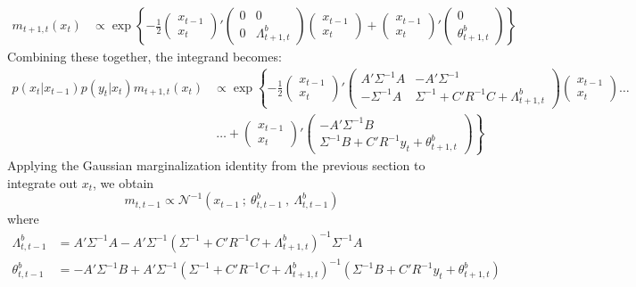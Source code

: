 \documentclass[12pt]{article}
\begin{document}
\begin{align*}
m_{t+1,t}(x_t)&\propto\exp\left\{-\frac{1}{2}\begin{pmatrix}x_{t-1}\\x_t\end{pmatrix}'\begin{pmatrix}0 & 0\\0 & \Lambda^b_{t+1,t}\end{pmatrix}\begin{pmatrix}x_{t-1}\\x_t\end{pmatrix} + \begin{pmatrix}x_{t-1}\\x_t\end{pmatrix}'\begin{pmatrix}0\\ \theta^b_{t+1,t}\end{pmatrix}\right\}
\end{align*}
Combining these together, the integrand becomes:
\begin{align*}
p(x_t|x_{t-1})p(y_t|x_t)m_{t+1,t}(x_t)&\propto\exp\left\{-\frac{1}{2}\begin{pmatrix}x_{t-1}\\x_t\end{pmatrix}'\begin{pmatrix}A'\Sigma^{-1}A & -A'\Sigma^{-1}\\-\Sigma^{-1}A & \Sigma^{-1}+C'R^{-1}C+\Lambda^b_{t+1,t}\end{pmatrix}\begin{pmatrix}x_{t-1}\\x_t\end{pmatrix}\right.\ldots\\
&\left. ~\ldots + \begin{pmatrix}x_{t-1}\\x_t\end{pmatrix}'\begin{pmatrix}-A'\Sigma^{-1}B\\ \Sigma^{-1}B+C'R^{-1}y_t+\theta^b_{t+1,t}\end{pmatrix}\right\}
\end{align*}
Applying the Gaussian marginalization identity from the previous section to integrate out $x_t$, we obtain
\[m_{t,t-1}\propto\mathcal{N}^{-1}(x_{t-1}~;~\theta^b_{t,t-1}~,~\Lambda^b_{t,t-1})\]
where
\begin{align*}
\Lambda^b_{t,t-1} &= A'\Sigma^{-1}A - A'\Sigma^{-1}(\Sigma^{-1}+C'R^{-1}C+\Lambda^b_{t+1,t})^{-1}\Sigma^{-1}A\\
\theta^b_{t,t-1} &= -A'\Sigma^{-1}B +A'\Sigma^{-1}(\Sigma^{-1}+C'R^{-1}C+\Lambda^b_{t+1,t})^{-1}(\Sigma^{-1}B+C'R^{-1}y_t+\theta^b_{t+1,t})
\end{align*}
\end{document}
